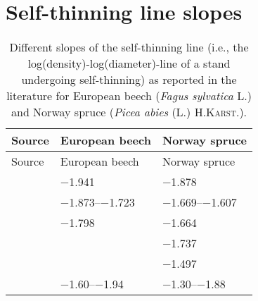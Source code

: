 \section{Self-thinning line slopes}

\begin{singlespace}
  {\tabulinesep=2mm
    \begin{longtabu}{L l l}
      \caption{Different slopes of the self-thinning line (i.e., the log(density)-log(diameter)-line of a stand undergoing self-thinning) as reported in the literature for European beech (\emph{Fagus sylvatica} L.) and Norway spruce (\emph{Picea abies} (L.) \textsc{H.Karst.}).} \\
      \toprule
      Source & European beech & Norway spruce \\
      \midrule
      \endfirsthead
      Source & European beech & Norway spruce \\
      \midrule
      \endhead
      \bottomrule
      \endlastfoot
      \textcite{Charru2012} & \num{-1.941} & \num{-1.878} \\
      \textcite{Pretzsch2006} & \numrange{-1.873}{-1.723} & \numrange{-1.669}{-1.607} \\
      \textcite{Pretzsch2005} & \num{-1.798} & \num{-1.664} \\
      \textcite{Sterba1987} & & \num{-1.737} \\
      \textcite{Vacchiano2013} & & \num{-1.497} \\
      \textcite{Vospernik2015} & \numrange{-1.60}{-1.94} & \numrange{-1.30}{-1.88} \\
    \end{longtabu}
  }
\end{singlespace}

